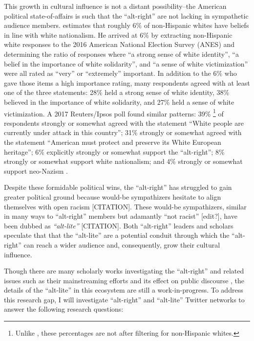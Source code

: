 \documentclass[acmlarge, screen, authorversion]{acmart}
\begin{document}
This growth in cultural influence is not a distant possibility–the
American political state-of-affairs is such that the “alt-right” are not lacking in sympathetic audience members. \citet{hawleyDemographyAltRight2018} estimates that roughly 6\% of
non-Hispanic whites have beliefs in line with white nationalism. He
arrived at 6\% by extracting non-Hispanic white responses to the 2016
American National Election Survey (ANES) and determining the ratio of
responses where “a strong sense of white identity”, “a belief in the
importance of white solidarity”, and “a sense of white victimization” were
all rated as “very” or “extremely” important. In addition to the 6\% who
gave those items a high importance rating, many respondents agreed with
at least one of the three statements: 28\% held a strong sense of white
identity, 38\% believed in the importance of white solidarity, and 27\%
held a sense of white victimization. A 2017 Reuters/Ipsos poll found
similar patterns: 39\% \footnote{Unlike \citet{hawleyDemographyAltRight2018}, these percentages are not after
filtering for non-Hispanic whites.} of respondents strongly or somewhat
agreed with the statement “White people are currently under attack in
this country”; 31\% strongly or somewhat agreed with the statement
“American must protect and preserve its White European heritage”; 6\%
explicitly strongly or somewhat support the “alt-right”; 8\% strongly or
somewhat support white nationalism; and 4\% strongly or somewhat support
neo-Nazism \cite{politicsNewPollAmericans}.

Despite these formidable political wins, the “alt-right” has
struggled to gain greater political ground because would-be sympathizers
hesitate to align themselves with open racism [CITATION]. These would-be
sympathizers, similar in many ways to “alt-right” members but adamantly
``not racist” [edit?], have been dubbed as \textit{``alt-lite”} [CITATION].
Both ``alt-right'' leaders and scholars speculate that that the ``alt-lite''
are a potential conduit through which the “alt-right” can reach a wider
audience and, consequently, grow their cultural influence.



Though there are many scholarly works investigating the
“alt-right” \cite{mainRiseAltRight2018, hawleyMakingSenseAltright2017, nagleKillAllNormies2017} and related issues such as their mainstreaming
efforts \cite{gallaherMainstreamingWhiteSupremacy2020} and its effect on public discourse \cite{sternProudBoysWhite2019, cammaertsMainstreamingExtremeRightWing2018}, the
details of the ``alt-lite” in this ecosystem are still a
work-in-progress. To address this research gap, I will investigate “alt-right” and “alt-lite” Twitter networks
to answer the following research questions:
\end{document}
